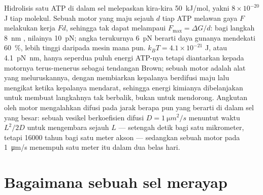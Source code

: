 \begin{proposition}\label{prop:b3:cytoskeleton-motility:physics}
Hidrolisis satu ATP di dalam sel melepaskan kira-kira \qty{50}{kJ/mol},
yakni $8\times 10^{-20}$ J tiap molekul. Sebuah motor yang maju sejauh $d$
tiap ATP melawan gaya $F$ melakukan kerja $Fd$, sehingga \emph{}
tak dapat melampaui $F_{\max} = \Delta G/d$: bagi langkah \qty{8}{nm} ,
nilainya \qty{10}{pN}; angka terukurnya \qty{6}{pN} berarti daya gunanya
mendekati \qty{60}{\%}, lebih tinggi daripada mesin mana pun. 
$k_{B}T =
4.1\times 10^{-21}$ J, atau \qty{4.1}{pN.nm}, hanya seperdua puluh energi
ATP-nya tetapi diantarkan kepada motornya terus-menerus sebagai tendangan
Brown; sebuah motor adalah alat yang meluruskannya, dengan membiarkan kepalanya
berdifusi maju lalu mengikat ketika kepalanya mendarat, sehingga energi
kimianya dibelanjakan untuk membuat langkahnya tak berbalik, bukan untuk
mendorong. Angkutan oleh motor mengalahkan difusi pada jarak berapa pun yang
berarti di dalam sel yang besar: sebuah vesikel berkoefisien difusi $D = \qty{1}{\micro
m^2/s}$ menuntut waktu $L^{2}/2D$ untuk mengembara sejauh $L$ --- setengah
detik bagi satu mikrometer, tetapi \num{16000} tahun bagi satu meter akson ---
sedangkan sebuah motor pada \qty{1}{\micro m/s} menempuh satu meter itu dalam
dua belas hari.
\end{proposition}
\admitted

\section{Bagaimana sebuah sel merayap}

